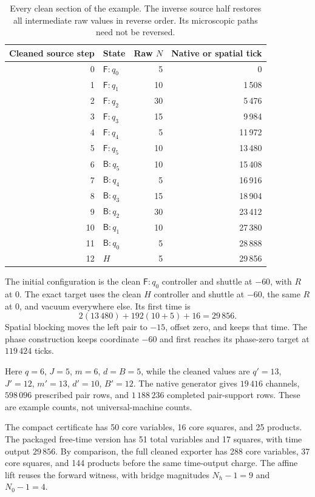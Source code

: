 \documentclass[11pt,letterpaper]{article}
\numberwithin{equation}{section}
\theoremstyle{definition}
\theoremstyle{remark}
\newcommand{\Fq}[1]{\mathsf F\!:#1}\newcommand{\Bq}[1]{\mathsf B\!:#1}
\begin{document}
\begin{table}[htbp]
\centering
\begin{tabular}{@{}r l r r@{}}
\toprule
Cleaned source step & State & Raw $N$ & Native or spatial tick\\
\midrule
0 & $\Fq {q_0}$ & 5 & 0\\
1 & $\Fq {q_1}$ & 10 & 1\,508\\
2 & $\Fq {q_2}$ & 30 & 5\,476\\
3 & $\Fq {q_3}$ & 15 & 9\,984\\
4 & $\Fq {q_4}$ & 5 & 11\,972\\
5 & $\Fq {q_5}$ & 10 & 13\,480\\
6 & $\Bq {q_5}$ & 10 & 15\,408\\
7 & $\Bq {q_4}$ & 5 & 16\,916\\
8 & $\Bq {q_3}$ & 15 & 18\,904\\
9 & $\Bq {q_2}$ & 30 & 23\,412\\
10 & $\Bq {q_1}$ & 10 & 27\,380\\
11 & $\Bq {q_0}$ & 5 & 28\,888\\
12 & $H$ & 5 & 29\,856\\
\bottomrule
\end{tabular}
\caption{Every clean section of the example. The inverse source half restores all intermediate raw values in reverse order. Its microscopic paths need not be reversed.}\label{smc:ct:tab:example}
\end{table}

The initial configuration is the clean $\Fq {q_0}$ controller and shuttle at $-60$, with $R$ at $0$. The exact target uses the clean $H$ controller and shuttle at $-60$, the same $R$ at $0$, and vacuum everywhere else. Its first time is
\[
2(13\,480)+192(10+5)+16=29\,856.
\]
Spatial blocking moves the left pair to $-15$, offset zero, and keeps that time. The phase construction keeps coordinate $-60$ and first reaches its phase-zero target at $119\,424$ ticks.

Here $q=6$, $J=5$, $m=6$, $d=B=5$, while the cleaned values are $q'=13$, $J'=12$, $m'=13$, $d'=10$, $B'=12$. The native generator gives $19\,416$ channels, $598\,096$ prescribed pair rows, and $1\,188\,236$ completed pair-support rows. These are example counts, not universal-machine counts.

The compact certificate has 50 core variables, 16 core squares, and 25 products. The packaged free-time version has 51 total variables and 17 squares, with time output $29\,856$. By comparison, the full cleaned exporter has 288 core variables, 37 core squares, and 144 products before the same time-output charge. The affine lift reuses the forward witness, with bridge magnitudes $N_h-1=9$ and $N_0-1=4$.
\end{document}
